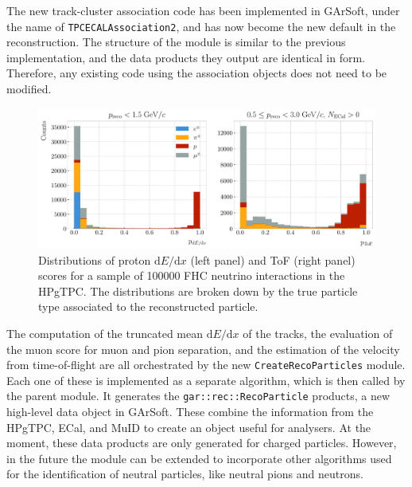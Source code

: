 The new track-cluster association code has been implemented in GArSoft, under the name of \texttt{TPCECALAssociation2}, and has now become the new default in the reconstruction. The structure of the module is similar to the previous implementation, and the data products they output are identical in form. Therefore, any existing code using the association objects does not need to be modified.

\begin{figure}[t]
    \centering
    \includegraphics[width=.99\linewidth]{Images/GArSoft_PID/caf_proton_scores.pdf}
    \caption[Distributions of proton $\mathrm{d}E/\mathrm{d}x$ and ToF scores for a sample of 100000 FHC neutrino interactions in the HPgTPC.]{Distributions of proton $\mathrm{d}E/\mathrm{d}x$ (left panel) and ToF (right panel) scores for a sample of 100000 FHC neutrino interactions in the HPgTPC. The distributions are broken down by the true particle type associated to the reconstructed particle.}
    \label{fig:proton_scores}
\end{figure}

The computation of the truncated mean $\mathrm{d}E/\mathrm{d}x$ of the tracks, the evaluation of the muon score for muon and pion separation, and the estimation of the velocity from time-of-flight are all orchestrated by the new \texttt{CreateRecoParticles} module. Each one of these is implemented as a separate algorithm, which is then called by the parent module. It generates the \texttt{gar::rec::RecoParticle} products, a new high-level data object in GArSoft. These combine the information from the HPgTPC, ECal, and MuID to create an object useful for analysers. At the moment, these data products are only generated for charged particles. However, in the future the module can be extended to incorporate other algorithms used for the identification of neutral particles, like neutral pions and neutrons.

